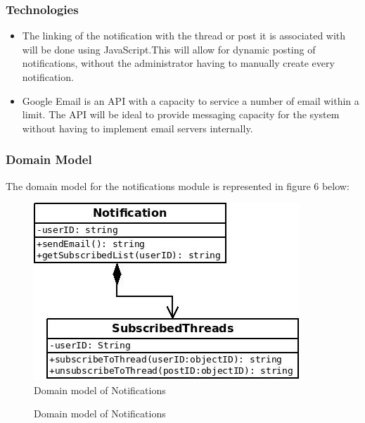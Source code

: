 \subsubsection{Technologies}
\begin{itemize}
\item The linking of the notification with the thread or post it is associated with will be done using JavaScript.This will allow for dynamic posting of notifications, without the administrator having to manually create every notification.
\item Google Email is an API with a capacity to service a number of email within a limit. The API will be ideal to provide messaging capacity for the system without having to implement email servers internally.
\end{itemize}

\subsubsection{Domain Model}
\par{The domain model for the notifications module is represented in figure 6 below:}

\begin{figure}[h!]
\includegraphics[width=\linewidth]{Diagrams/NotificationDM.jpeg}
\caption{Domain model of Notifications}
\end{figure}

\begin{figure}[h!]
\caption{Domain model of Notifications}
\end{figure}